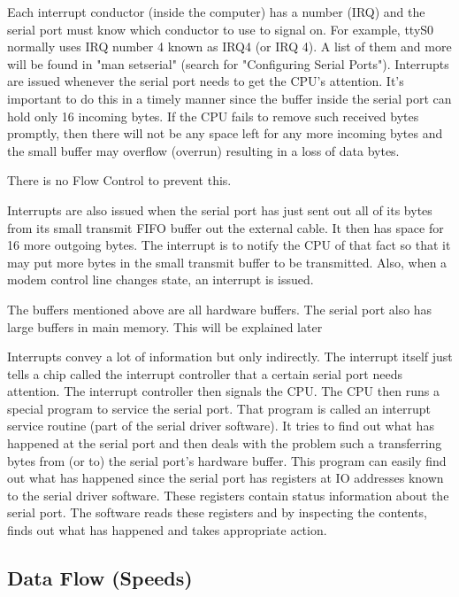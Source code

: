 \documentclass[11pt, twosides, titlepage]{article}
\begin{document}
        Each interrupt conductor (inside the computer) has a number (IRQ) and the serial port must know which conductor to use to signal on. For example, ttyS0 normally uses IRQ number 4 known as IRQ4 (or IRQ 4). A list of them and more will be found in "man setserial" (search for "Configuring Serial Ports"). Interrupts are issued whenever the serial port needs to get the CPU's attention. It's important to do this in a timely manner since the buffer inside the serial port can hold only 16 incoming bytes. If the CPU fails to remove such received bytes promptly, then there will not be any space left for any more incoming bytes and the small buffer may overflow (overrun) resulting in a loss of data bytes.

        There is no Flow Control to prevent this.

        Interrupts are also issued when the serial port has just sent out all of its bytes from its small transmit FIFO buffer out the external cable. It then has space for 16 more outgoing bytes. The interrupt is to notify the CPU of that fact so that it may put more bytes in the small transmit buffer to be transmitted. Also, when a modem control line changes state, an interrupt is issued.

        The buffers mentioned above are all hardware buffers. The serial port also has large buffers in main memory. This will be explained later

        Interrupts convey a lot of information but only indirectly. The interrupt itself just tells a chip called the interrupt controller that a certain serial port needs attention. The interrupt controller then signals the CPU. The CPU then runs a special program to service the serial port. That program is called an interrupt service routine (part of the serial driver software). It tries to find out what has happened at the serial port and then deals with the problem such a transferring bytes from (or to) the serial port's hardware buffer. This program can easily find out what has happened since the serial port has registers at IO addresses known to the serial driver software. These registers contain status information about the serial port. The software reads these registers and by inspecting the contents, finds out what has happened and takes appropriate action.

    \subsection{Data Flow (Speeds)}
\end{document}

